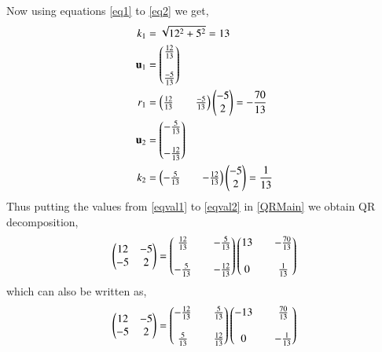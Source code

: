 \documentclass[journal,12pt,twocolumn]{IEEEtran}
\begin{document}
Now using equations \eqref{eq1} to \eqref{eq2} we get, 
\begin{align}
    k_1 &= \sqrt{12^2+5^2} = 13\label{eqval1}\\ 
    \mathbf{u}_1 &= \begin{pmatrix}\frac{12}{13}\\ \\ \frac{-5}{13}\end{pmatrix} \\
    r_1 &= \begin{pmatrix}\frac{12}{13}&&\frac{-5}{13}\end{pmatrix}\begin{pmatrix}-5 \\ 2\end{pmatrix} = -\frac{70}{13}\\ 
    \mathbf{u}_2 &= \begin{pmatrix}-\frac{5}{13} \\\\ -\frac{12}{13}\end{pmatrix} \\
    k_2 &= \begin{pmatrix}-\frac{5}{13}&&-\frac{12}{13}\end{pmatrix}\begin{pmatrix}-5\\2\end{pmatrix} = \frac{1}{13}\label{eqval2} 
\end{align}
Thus putting the values from \eqref{eqval1} to \eqref{eqval2} in \eqref{QRMain} we obtain QR decomposition,
\begin{align}
    \begin{pmatrix}12 & -5\\ -5 & 2\end{pmatrix} =\begin{pmatrix}\frac{12}{13}&&-\frac{5}{13}\\\\-\frac{5}{13}&&-\frac{12}{13}\end{pmatrix}\begin{pmatrix}13 && -\frac{70}{13}\\\\0&&\frac{1}{13}\end{pmatrix}
\end{align}
which can also be written as,
\begin{align}
  \begin{pmatrix}12 & -5\\ -5 & 2\end{pmatrix} =\begin{pmatrix}-\frac{12}{13}&&\frac{5}{13}\\\\\frac{5}{13}&&\frac{12}{13}\end{pmatrix}\begin{pmatrix}-13 && \frac{70}{13}\\\\0&&-\frac{1}{13}\end{pmatrix}
\end{align}
\end{document}
